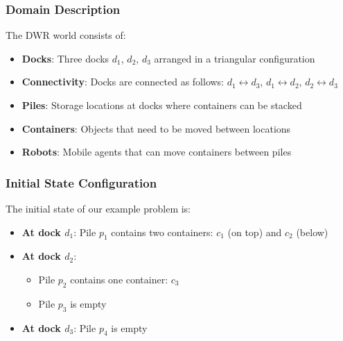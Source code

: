 \documentclass[11pt,a4paper]{article}
\theoremstyle{definition}
\theoremstyle{plain}
\theoremstyle{remark}
\begin{document}
\subsubsection{Domain Description}

The DWR world consists of:

\begin{itemize}
    \item \textbf{Docks}: Three docks $d_1$, $d_2$, $d_3$ arranged in a triangular configuration
    \item \textbf{Connectivity}: Docks are connected as follows: $d_1 \leftrightarrow d_3$, $d_1 \leftrightarrow d_2$, $d_2 \leftrightarrow d_3$
    \item \textbf{Piles}: Storage locations at docks where containers can be stacked
    \item \textbf{Containers}: Objects that need to be moved between locations
    \item \textbf{Robots}: Mobile agents that can move containers between piles
\end{itemize}

\begin{center}
\end{center}

\subsubsection{Initial State Configuration}

The initial state of our example problem is:

\begin{itemize}
    \item \textbf{At dock $d_1$}: Pile $p_1$ contains two containers: $c_1$ (on top) and $c_2$ (below)
    \item \textbf{At dock $d_2$}: 
    \begin{itemize}
        \item Pile $p_2$ contains one container: $c_3$
        \item Pile $p_3$ is empty
    \end{itemize}
    \item \textbf{At dock $d_3$}: Pile $p_4$ is empty
\end{itemize}
\end{document}
